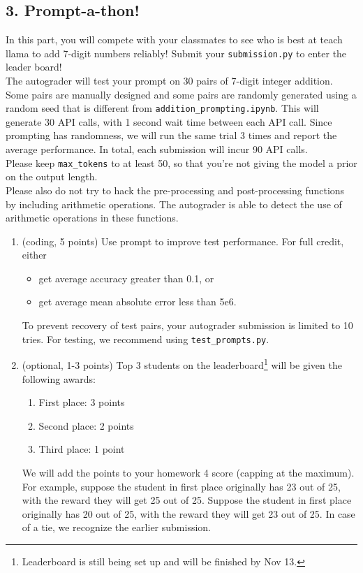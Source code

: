 \documentclass{article}
\theoremstyle{case}
\theoremstyle{definition}
\begin{document}
\newpage
\subsection*{3. Prompt-a-thon!}

In this part, you will compete with your classmates to see who is best at teach llama to add 7-digit numbers reliably! Submit your \texttt{submission.py} to enter the leader board!\\

The autograder will test your prompt on 30 pairs of 7-digit integer addition. Some pairs are manually designed and some pairs are randomly generated using a random seed that is different from \texttt{addition\_prompting.ipynb}. This will generate 30 API calls, with 1 second wait time between each API call. Since prompting has randomness, we will run the same trial 3 times and report the average performance. In total, each submission will incur 90 API calls. \\

Please keep \texttt{max\_tokens} to at least 50, so that you're not giving the model a prior on the output length. \\ Please also do not try to hack the pre-processing and post-processing functions by including arithmetic operations. The autograder is able to detect the use of arithmetic operations in these functions.

\begin{enumerate}[label=\alph*.]
    \item (coding, 5 points) Use prompt to improve test performance. For full credit, either
    \begin{itemize}
        \item get average accuracy greater than 0.1, or
        \item get average mean absolute error less than 5e6.
    \end{itemize}
    To prevent recovery of test pairs, your autograder submission is limited to 10 tries. For testing, we recommend using \texttt{test\_prompts.py}.
    \item (optional, 1-3 points)
    Top 3 students on the leaderboard\footnote[1]{Leaderboard is still being set up and will be finished by Nov 13.} will be given the following awards:
    \begin{enumerate}
        \item First place: 3 points
        \item Second place: 2 points
        \item Third place: 1 point
    \end{enumerate}
    We will add the points to your homework 4 score (capping at the maximum). For example, suppose the student in first place originally has 23 out of 25, with the reward they will get 25 out of 25. Suppose the student in first place originally has 20 out of 25, with the reward they will get 23 out of 25. In case of a tie, we recognize the earlier submission.
\end{enumerate}
\end{document}
